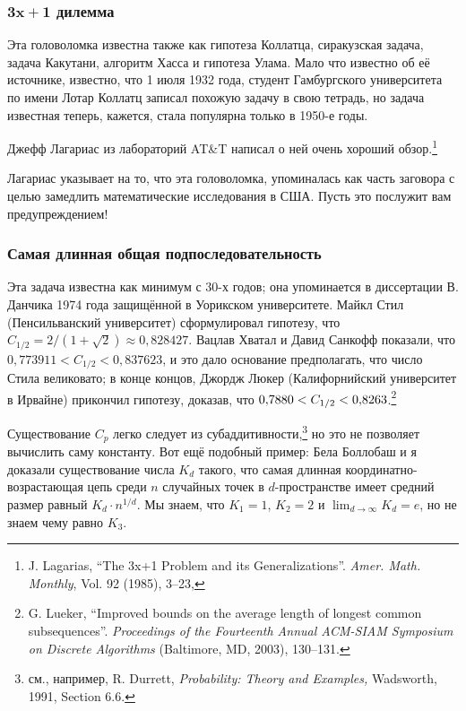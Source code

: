 \subsubsection*{$\bm{3x+1}$ дилемма}

Эта головоломка известна также как гипотеза Коллатца, сиракузская задача, задача Какутани, алгоритм Хасса и гипотеза Улама.
Мало что известно об её источнике, известно, что 1 июля 1932 года, студент Гамбургского университета по имени Лотар Коллатц записал похожую задачу в свою тетрадь, но задача известная теперь, кажется, стала популярна только в 1950-е годы.

Джефф Лагариас из лабораторий AT\&T написал о ней очень хороший обзор.\footnote{J. Lagarias, ``The 3x+1 Problem and its Generalizations''. \emph{Amer. Math. Monthly}, Vol. 92 (1985), 3--23,%
}

Лагариас указывает на то, что эта головоломка, упоминалась как часть заговора с целью замедлить математические исследования в США.
Пусть это послужит вам предупреждением!

\subsubsection*{Самая длинная общая подпоследовательность}

Эта задача известна как минимум с 30-х годов; она упоминается в диссертации В. Данчика 1974 года защищённой в Уорикском университете.
Майкл Стил (Пенсильванский университет) сформулировал гипотезу, что $C_{1/2} = 2/(1+\sqrt{2})\approx 0{,}828427$.
Вацлав Хватал и Давид Санкофф показали, что $0{,}773911 < C_{1/2} < 0{,}837623$, и это дало основание предполагать, что число Стила великовато;
в конце концов, Джордж Люкер (Калифорнийский университет в Ирвайне) прикончил гипотезу, доказав, что $0{,}7880 \z< C_{1/2} \z< 0{,}8263$.\footnote{
G. Lueker, 
``Improved bounds on the average length of longest common subsequences''. \emph{Proceedings of the Fourteenth Annual ACM-SIAM Symposium on Discrete Algorithms} (Baltimore, MD, 2003), 130–131.}

Существование $C_p$ легко следует из субаддитивности,\footnote{см., например, R. Durrett, \textit{Probability: Theory and Examples,} Wadsworth, 1991, Section 6.6.} но это не позволяет вычислить саму константу.
Вот ещё подобный пример: Бела Боллобаш и я доказали существование числа $K_d$ такого, что самая длинная координатно-возрастающая цепь среди $n$ случайных точек в $d$-пространстве имеет средний размер равный $K_d\cdot n^{1/d}$.
Мы знаем, что $K_1=1$, $K_2=2$ и $\lim_{d\to\infty} K_d=e$, но не знаем чему равно $K_3$.

